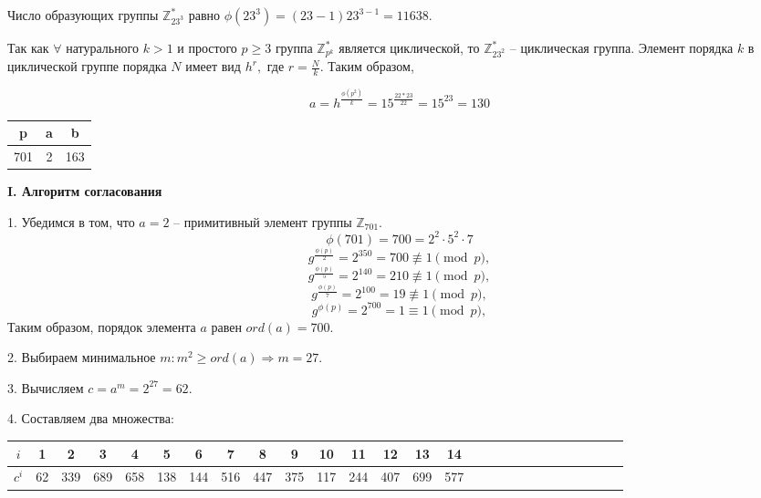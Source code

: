 \documentclass[a4paper,11pt,openany]{book}
\begin{document}

Число образующих группы $\mathbb{Z}_{23^3}^*$ равно $\phi(23^3) = (23 - 1) 23 ^ {3 - 1} = 11638.$


Так как $\forall$ натурального $k>1$ и простого $p \ge 3$ группа $\mathbb{Z}_{p^k}^*$ является циклической, то $\mathbb{Z}_{23^2}^*$ -- циклическая группа. Элемент порядка $k$ в циклической группе порядка $N$ имеет вид $h^r,$ где $r = \frac{N}{k}.$ Таким образом,

$$ a = h ^ { \frac{\phi(p ^ 2)}{k} } = 15 ^ { \frac{22 * 23}{22} } = 15 ^ {23} = 130 $$


\medskip

{\centering
\begin{tabular}{||c|c|c||}
\hline
\textbf{p} & \textbf{a} & \textbf{b} \\
\hline
701 & 2 & 163 \\
\hline
\end{tabular}

}

\medskip

\noindent \textbf{I. Алгоритм согласования }

1. Убедимся в том, что $a=2$ -- примитивный элемент группы $\mathbb{Z}_{701}$.
$$\phi(701) = 700 = 2^2 \cdot 5^2 \cdot 7$$
$$ g^{ \frac{\phi(p)}{2} } = 2 ^ {350} = 700 \not\equiv 1 \pmod p,$$
$$ g^{ \frac{\phi(p)}{5} } = 2 ^ {140} = 210 \not\equiv 1 \pmod p,$$
$$ g^{ \frac{\phi(p)}{7} } = 2 ^ {100} = 19 \not\equiv 1 \pmod p,$$
$$ g^{ \phi(p) } = 2 ^ {700} = 1 \equiv 1 \pmod p,$$
\noindent Таким образом, порядок элемента $a$ равен $ord(a) = 700$.

2. Выбираем минимальное $m \colon m^2 \ge ord(a) \Rightarrow m = 27.$ 

3. Вычисляем $c = a^m = 2 ^ {27} = 62.$

4. Составляем два множества:

\medskip

{\centering
\begin{tabular}{||c|c|c|c|c|c|c|c|c|c|c|c|c|c|c|c|c|c|c|c|c|c|c|c|c|c|c||}
\hline
$i$ & 1 & 2 & 3 & 4 & 5 & 6 & 7 & 8 & 9 & 10 & 11 & 12 & 13 & 14 \\
\hline
$c^i$ & 62 & 339 & 689 & 658 & 138 & 144 & 516 & 447 & 375 & 117 & 244 & 407 & 699 & 577 \\
\hline
\end{tabular}

}
\end{document}
